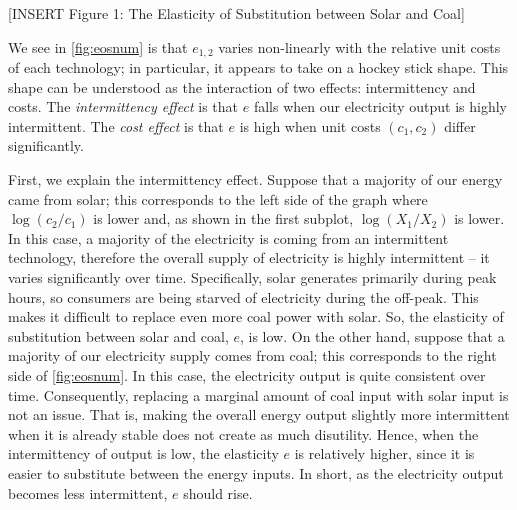 \documentclass[11pt,a4paper,leqno]{extarticle}
\begin{document}
	
	\vspace{0.15in}
	\begin{center}
		[INSERT Figure 1: The Elasticity of Substitution between Solar and Coal]
	\end{center}
	\vspace{0.15in}
	
	
	We see in \autoref{fig:eosnum} is that $e_{1,2}$ varies non-linearly with the relative unit costs of each technology; in particular, it appears to take on a hockey stick shape.  This shape can be understood as the interaction of two effects: intermittency and costs. The \textit{intermittency effect} is that $e$ falls when our electricity output is highly intermittent. The \textit{cost effect} is that $e$ is high when unit costs $(c_1, c_2)$ differ significantly.
	
	First, we explain the intermittency effect.  Suppose that a majority of our energy came from solar; this corresponds to the left side of the graph where $\log(c_2/c_1)$ is lower and, as shown in the  first subplot, $\log(X_1/X_2)$ is lower. In this case, a majority of the electricity is coming from an intermittent technology, therefore the overall supply of electricity is highly intermittent -- it varies significantly over time. Specifically, solar generates primarily during peak hours, so consumers are being starved of electricity during the off-peak. This makes it difficult to replace even more coal power with solar. So, the elasticity of substitution between solar and coal, $e$, is low. On the other hand, suppose that a majority of our electricity supply comes from coal; this corresponds to the right side of \autoref{fig:eosnum}. In this case, the electricity output is quite consistent over time. Consequently, replacing a marginal amount of coal input with solar input is not an issue. That is, making the overall energy output slightly more intermittent when it is already stable does not create as much disutility.  Hence, when the intermittency of output is low, the elasticity $e$ is relatively higher, since it is easier to substitute between the energy inputs.  In short, as the electricity output becomes less intermittent, $e$ should rise. 
	
\end{document}

